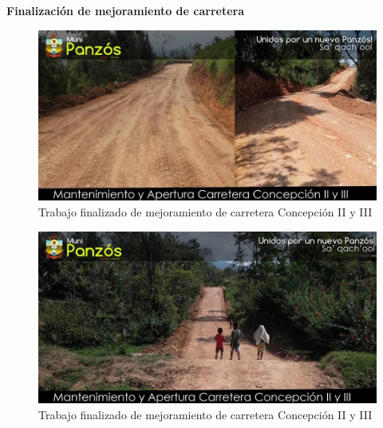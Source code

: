 \documentclass[12pt,spanish,Letterpaper,openany]{book}
\begin{document}
\begin {center}

\textbf{Finalización de mejoramiento de carretera}

\end {center}

\begin{figure}[H]

{\centering \includegraphics[width=0.7\linewidth]{images/image06_mgarcia} 

}

\caption{Trabajo finalizado de mejoramiento de carretera Concepción II y III}\label{fig:unnamed-chunk-20}
\end{figure}

\begin{figure}[H]

{\centering \includegraphics[width=0.7\linewidth]{images/image07_mgarcia} 

}

\caption{Trabajo finalizado de mejoramiento de carretera Concepción II y III}\label{fig:unnamed-chunk-21}
\end{figure}
\end{document}
